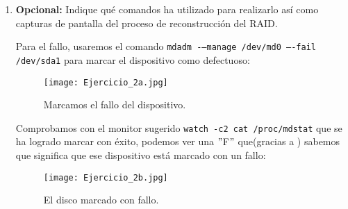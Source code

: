 \documentclass[paper=a4, fontsize=11pt]{scrartcl} %
\numberwithin{equation}{section} %
\numberwithin{figure}{section} %
\numberwithin{table}{section} %
\begin{document}
\begin{enumerate}
\begin{enumerate}
			Para automatizar el proceso de creación y borrado de estos archivos, se hace uso de
			\textit{logrotate}\cite{man_logrotate} ejecutándose diariamente con \textit{cron}. Este
			comando, revisa los archivos log y, en función del archivo de configuración del servicio
			asociado, lo borra(si excede el tiempo establecido\footnote{Puede ser que lo que determine
			si un archivo de log debe ser borrado sea que hay muchas copias de log del servicio
			asociado, en cuyo caso, se borra la más antigua.}) o crea uno nuevo(si el actual tiene más
			tiempo del que está establecido\footnote{Puede ser que la condición para determinar si un
			archivo de log debe dejar de escribirse en él y empezar a escribir en otro nuevo sea que
			ha excedido cierto tamaño.}).
			
			Cada vez que se crea un nuevo archivo con \textit{logrotate}, su formato por defecto
			es $<$service\_name$>$.$<$other\_values$>$.$<$version\_number$>$.gz\footnote{Cada vez que
			se llama a \textit{logrotate}, se renombran los archivos, esto es, el más antiguo, será el
			que mayor número de versión tenga. Además, el primer archivo, no tendrá el número de
			versión.}, aunque este formato puede ser modificado en el correspondiente archivo de
			configuración.
		\end{enumerate}
		
	\subsubsection{Volviendo con el RAID1}
		\item \textbf{Opcional:} Indique qué comandos ha utilizado para realizarlo así como capturas
		de pantalla del proceso de reconstrucción del RAID.
		
		Para el fallo, usaremos el comando \verb|mdadm -–manage /dev/md0 –-fail /dev/sda1|
		\cite{man_mdadm} para marcar el dispositivo como defectuoso:
		
		\begin{figure}[H]
			\centering
			\texttt{[image: Ejercicio\_2a.jpg]}
			\caption{Marcamos el fallo del dispositivo.}
			\label{fig:mark}	
		\end{figure}
		
		Comprobamos con el monitor sugerido \verb|watch -c2 cat /proc/mdstat| que se ha logrado marcar
		con éxito, podemos ver una $"$F$"$ que(gracias a \cite{wiki_mdstat}) sabemos que significa que
		ese dispositivo está marcado con un fallo:
		
		\begin{figure}[H]
			\centering
			\texttt{[image: Ejercicio\_2b.jpg]}
			\caption{El disco marcado con fallo.}
			\label{fig:m_status}	
		\end{figure}
		

\end{enumerate}
\end{document}
